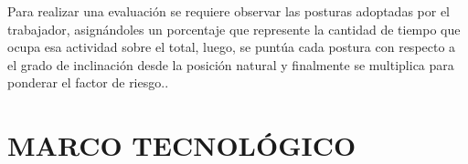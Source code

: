 Para realizar una evaluación se requiere observar las posturas adoptadas por el trabajador, asignándoles un porcentaje que represente la cantidad de tiempo que ocupa esa actividad sobre el total, luego, se puntúa cada postura con respecto a el grado de inclinación desde la posición natural y finalmente se multiplica para ponderar el factor de riesgo.\parencite{Nogareda2009TareasErgonomicos}.
\section{MARCO TECNOLÓGICO}